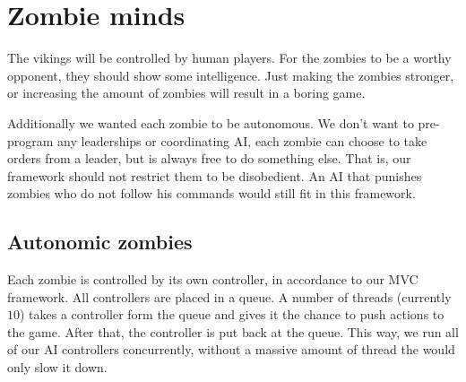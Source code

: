 \section{Zombie minds}

The vikings will be controlled by human players. For the zombies to be a worthy opponent, they should show some intelligence. Just making the zombies stronger, or increasing the amount of zombies will result in a boring game.

Additionally we wanted each zombie to be autonomous. We don't want to pre-program any leaderships or coordinating AI, each zombie can choose to take orders from a leader, but is always free to do something else. That is, our framework should not restrict them to be disobedient. An AI that punishes zombies who do not follow his commands would still fit in this framework.

\subsection{Autonomic zombies}
Each zombie is controlled by its own controller, in accordance to our MVC framework. All controllers are placed in a queue. A number of threads (currently $10$) takes a controller form the queue and gives it the chance to push actions to the game. After that, the controller is put back at the queue. This way, we run all of our AI controllers concurrently, without a massive amount of thread the would only slow it down.

